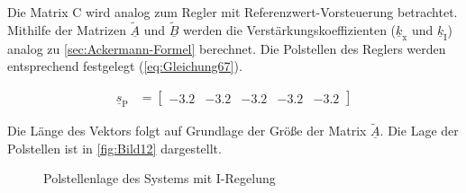 Die Matrix C wird analog zum Regler mit Referenzwert-Vorsteuerung betrachtet. Mithilfe der Matrizen $\underline{\tilde{A}}$ und $\underline{\tilde{B}}$ werden die Verstärkungskoeffizienten ($\underline{k}_{\mathrm{x}}$ und $\underline{k}_{\mathrm{I}}$) analog zu \autoref{sec:Ackermann-Formel} berechnet. Die Polstellen des Reglers werden entsprechend festgelegt (\autoref{eq:Gleichung67}).

\begin{align}\label{eq:Gleichung67}
    \underline{s}_{\mathrm{P}} &= 
    \begin{bmatrix}
        -3.2 & -3.2 & -3.2 & -3.2 & -3.2
    \end{bmatrix}
\end{align}

Die Länge des Vektors folgt auf Grundlage der Größe der Matrix $\underline{\tilde{A}}$. Die Lage der Polstellen ist in \autoref{fig:Bild12} dargestellt.

\begin{figure}[H]
    \centering
    \caption[Polstellenlage I-Regelung]{Polstellenlage des Systems mit I-Regelung}
    \label{fig:Bild12}
\end{figure}

